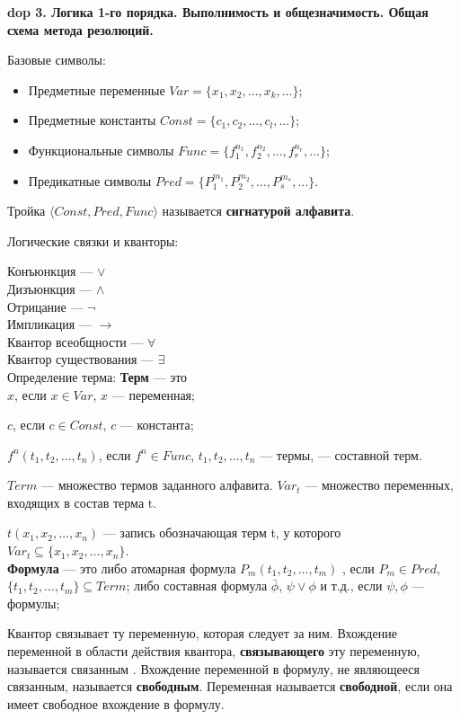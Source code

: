  \textbf{\LARGE dop 3. Логика 1-го порядка.  Выполнимость и общезначимость. Общая схема метода резолюций.}

Базовые символы: 
\begin{itemize}
    \item Предметные переменные $Var = \{x_1, x_2, \ldots, x_k, \ldots\}$;
    \item Предметные константы $Const = \{c_1, c_2,\ldots, c_l,\ldots\}$;
    \item Функциональные символы $Func = \{f^{n_1}_1,f^{n_2}_2,\ldots, f^{n_r}_r,\ldots\}$;
    \item Предикатные символы $Pred = \{P^{m_1}_1,P^{m_2}_2, \ldots, P^{m_s}_s,\ldots\}$.
\end{itemize}
Тройка $\langle Const,Pred,Func\rangle$ называется \textbf{сигнатурой алфавита}.

Логические связки и кванторы: 

Конъюнкция --- $\vee$ \\
Дизъюнкция --- $ \wedge $ \\
Отрицание --- $ \lnot $ \\
Импликация --- $ \longrightarrow $ \\
Квантор всеобщности --- $ \forall $ \\
Квантор существования --- $\exists$ \\


Определение терма: 
\textbf{Терм} --- это \\
$x$, если $x \in Var$, $x$ --- переменная;

$c$, если $c \in Const$, $c$ --- константа;

$f^n(t_1, t_2,\ldots, t_n)$,  если $f^n \in Func$, $t_1, t_2,\ldots, t_n$ --- термы, --- составной терм.

$Term$ --- множество термов заданного алфавита.
$Var_t$ --- множество переменных, входящих в состав терма t.

$t(x_1, x_2,\ldots, x_n)$ --- запись обозначающая терм t, у которого ${Var}_t \subseteq \{x_1, x_2,\ldots, x_n\}$.\\

\textbf{Формула} --- это либо атомарная формула
$P_m(t_1, t_2,\ldots, t_m)$ , если $ P_m \in Pred $, $\{t_1, t_2,\ldots, t_m\} \subseteq Term $; 
либо составная формула
$\bar{\phi}$, $\psi \vee \phi$ и т.д., если $\psi, \phi$ — формулы; 

Квантор связывает ту переменную, которая следует за ним.
Вхождение переменной в области действия квантора, \textbf{связывающего} эту переменную, называется связанным .
Вхождение переменной в формулу, не являющееся связанным, называется \textbf{свободным}.
Переменная называется \textbf{свободной}, если она имеет свободное вхождение в формулу.

